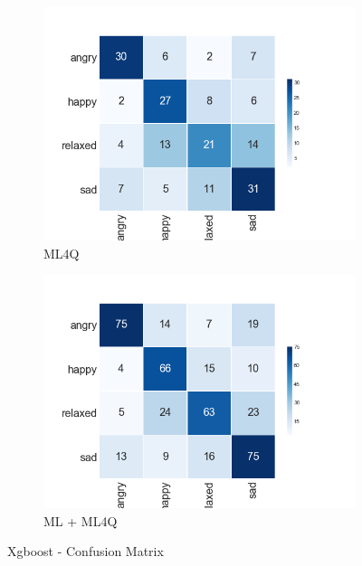 \begin{figure}[H]
  \centering
  \begin{subfigure}[b]{0.49\linewidth}
    \includegraphics[width=\linewidth]{./chapters/chapter4/images/4Q/CM_XGB.png}
    \caption{ML4Q}
  \end{subfigure}
  \begin{subfigure}[b]{0.49\linewidth}
   \includegraphics[width=\linewidth]{./chapters/chapter4/images/join/CM_XGB.png}
    \caption{ML + ML4Q}
  \end{subfigure}
  \caption{Xgboost - Confusion Matrix}
  \label{fig:xgb}
\end{figure}